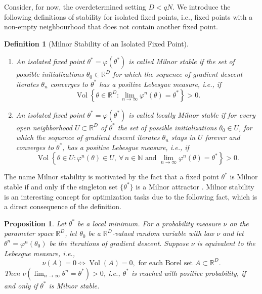 \documentclass[10pt]{article}
\newcommand{\R}{{\mathbb R}}
\def\R{\mathbb{R}}
\newtheorem{definition}[theorem]{Definition}
\newtheorem{proposition}[theorem]{Proposition}
\begin{document}
Consider, for now, the overdetermined setting $D<qN$. We introduce the following definitions of stability for isolated fixed points, i.e., fixed points with a non-empty neighbourhood that does not contain another fixed point.
\begin{definition}[Milnor Stability of an Isolated Fixed Point]\label{cekk_def:Milnor}~
	\begin{enumerate}
		\item[(i)]An isolated fixed point $\theta^* = \varphi(\theta^*)$ is called \emph{Milnor stable} if the set of possible initializations $\theta_0\in \R^D$ for which the sequence of gradient descent iterates $\theta_n$ converges to $\theta^*$ has a positive Lebesgue measure, i.e., if
		$$\operatorname{Vol}\left\{\theta \in \R^D : \lim_{n \to \infty} \varphi^n(\theta) = \theta^*\right\}>0.$$
		\item[(ii)]An isolated fixed point $\theta^* = \varphi(\theta^*)$ is called \emph{locally Milnor stable} if for every open neighborhood $U\subset \R^D$ of $\theta^*$ the set of possible initializations $\theta_0\in U$, for which the sequence of gradient descent iterates $\theta_n$ stays in $U$ forever and converges to $\theta^*$, has a positive Lebesgue measure, i.e., if
		$$\operatorname{Vol}\left\{\theta \in U : \varphi^n(\theta) \in U,~\forall\,n \in \mathbb N \text{ and }\lim_{n \to \infty} \varphi^n(\theta) = \theta^*\right\}>0.$$
	\end{enumerate}
\end{definition}
The name Milnor stability is motivated by the fact that a fixed point $\theta^*$ is Milnor stable if and only if the singleton set $\{\theta^*\}$ is a Milnor attractor \cite{Milnor85}. Milnor stability is an interesting concept for optimization tasks due to the following fact, which is a direct consequence of the definition.
\begin{proposition} \label{cekk_prop:OdetInterpr}
	Let $\theta^*$ be a local minimum.
	For a probability measure $\nu$ on the parameter space $\R^D$, let $\theta_0$ be a $\R^D$-valued random variable with law $\nu$ and let $\theta^n = \varphi^n(\theta_0)$ be the iterations of gradient descent. Suppose $\nu$ is equivalent to the Lebesgue measure, i.e.,
	\begin{equation}\label{cekk_def:equi}
		\nu(A) = 0 \Leftrightarrow \operatorname{Vol}(A) = 0, \text{ for each Borel set $A\subset \R^D$}.
	\end{equation}
	Then $\nu(\lim_{n \to \infty} \theta^n =\theta^*)>0$, i.e., $\theta^*$ is reached with positive probability, if and only if $\theta^*$ is Milnor stable.
\end{proposition}
\end{document}

